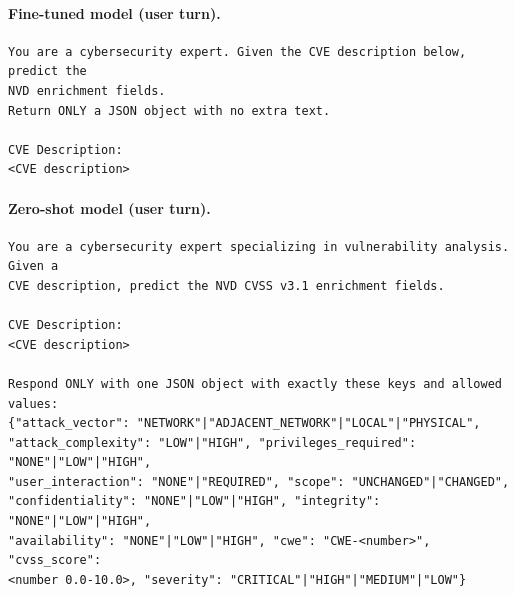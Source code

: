 \paragraph{Fine-tuned model (user turn).}
{\footnotesize \begin{verbatim}
You are a cybersecurity expert. Given the CVE description below, predict the
NVD enrichment fields.
Return ONLY a JSON object with no extra text.

CVE Description:
<CVE description>
\end{verbatim}}

\paragraph{Zero-shot model (user turn).}
{\footnotesize \begin{verbatim}
You are a cybersecurity expert specializing in vulnerability analysis. Given a
CVE description, predict the NVD CVSS v3.1 enrichment fields.

CVE Description:
<CVE description>

Respond ONLY with one JSON object with exactly these keys and allowed values:
{"attack_vector": "NETWORK"|"ADJACENT_NETWORK"|"LOCAL"|"PHYSICAL",
"attack_complexity": "LOW"|"HIGH", "privileges_required": "NONE"|"LOW"|"HIGH",
"user_interaction": "NONE"|"REQUIRED", "scope": "UNCHANGED"|"CHANGED",
"confidentiality": "NONE"|"LOW"|"HIGH", "integrity": "NONE"|"LOW"|"HIGH",
"availability": "NONE"|"LOW"|"HIGH", "cwe": "CWE-<number>", "cvss_score":
<number 0.0-10.0>, "severity": "CRITICAL"|"HIGH"|"MEDIUM"|"LOW"}
\end{verbatim}}
